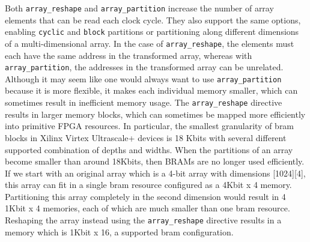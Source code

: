 Both \lstinline{array_reshape} and \lstinline{array_partition} increase the number of array elements that can be read each clock cycle.  They also support the same options, enabling \lstinline{cyclic} and \lstinline{block} partitions or partitioning along different dimensions of a multi-dimensional array.  In the case of \lstinline{array_reshape}, the elements must each have the same address in the transformed array, whereas with \lstinline{array_partition}, the addresses in the transformed array can be unrelated.  Although it may seem like one would always want to use \lstinline{array_partition} because it is more flexible, it makes each individual memory smaller, which can sometimes result in inefficient memory usage.  The \lstinline{array_reshape} directive results in larger memory blocks, which can sometimes be mapped more efficiently into primitive FPGA resources.   In particular, the smallest granularity of \gls{bram} blocks in Xilinx Virtex Ultrascale+ devices is 18 Kbits with several different supported combination of depths and widths.  When the partitions of an array become smaller than around 18Kbits, then BRAMs are no longer used efficiently.  If we start with an original array which is a 4-bit array with dimensions [1024][4], this array can fit in a single \gls{bram} resource configured as a 4Kbit x 4 memory.  Partitioning this array completely in the second dimension would result in 4 1Kbit x 4 memories, each of which are much smaller than one \gls{bram} resource.  Reshaping the array instead using the \lstinline{array_reshape} directive results in a memory which is 1Kbit x 16, a supported \gls{bram} configuration.




